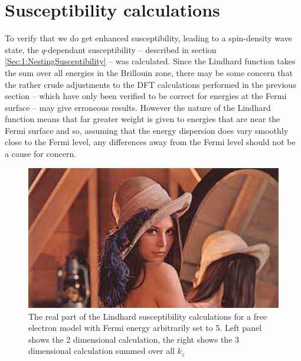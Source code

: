 
\section{Susceptibility calculations}
    \label{Sec:3:SubsceptibilityCalculation}


To verify that we do get enhanced susceptibility, leading to a spin-density wave state, the $q$-dependant susceptibility -- described in section \ref{Sec:1:NestingSusceptibility} -- was calculated. Since the Lindhard function takes the sum over all energies in the Brillouin zone, there may be some concern that the rather crude adjustments to the DFT calculations performed in the previous section -- which have only been verified to be correct for energies at the Fermi surface -- may give erroneous results. However the nature of the Lindhard function means that far greater weight is given to energies that are near the Fermi surface and so, assuming that the energy dispersion does vary smoothly close to the Fermi level, any differences away from the Fermi level should not be a cause for concern.

\begin{figure}[htbp]
    \begin{center}
        \includegraphics[scale=0.9]{Misc/TODO}
        \caption{The real part of the Lindhard susceptibility calculations for a free electron model with Fermi energy arbitrarily set to 5. Left panel shows the 2 dimensional calculation, the right shows the 3 dimensional calculation summed over all $k_z$}
        \label{Fig:3:FreeElectronSusceptibility}
    \end{center}
\end{figure}

